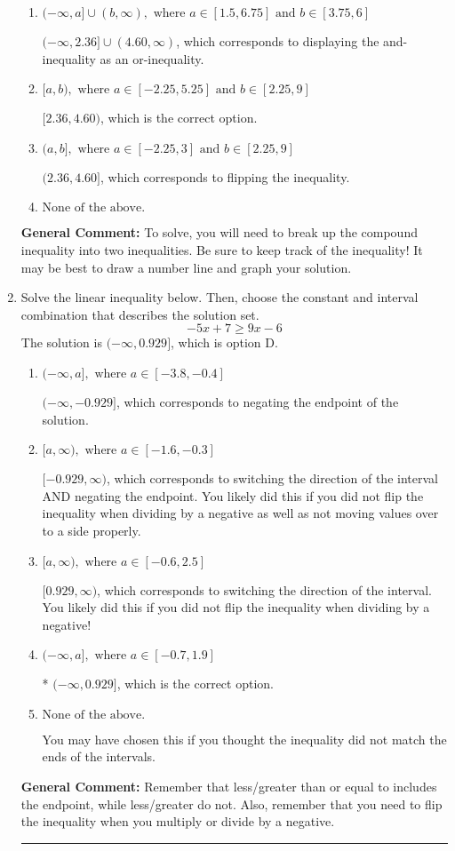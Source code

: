 \documentclass{extbook}[14pt]
\newcommand{\litem}[1]{\item #1

\rule{\textwidth}{0.4pt}}
\begin{document}
\begin{enumerate}
{\begin{enumerate}[label=\Alph*.]
$(-\infty, 2.36) \cup [4.60, \infty)$, which corresponds to displaying the and-inequality as an or-inequality AND flipping the inequality.
\item \( (-\infty, a] \cup (b, \infty), \text{ where } a \in [1.5, 6.75] \text{ and } b \in [3.75, 6] \)

$(-\infty, 2.36] \cup (4.60, \infty)$, which corresponds to displaying the and-inequality as an or-inequality.
\item \( [a, b), \text{ where } a \in [-2.25, 5.25] \text{ and } b \in [2.25, 9] \)

$[2.36, 4.60)$, which is the correct option.
\item \( (a, b], \text{ where } a \in [-2.25, 3] \text{ and } b \in [2.25, 9] \)

$(2.36, 4.60]$, which corresponds to flipping the inequality.
\item \( \text{None of the above.} \)


\end{enumerate}

\textbf{General Comment:} To solve, you will need to break up the compound inequality into two inequalities. Be sure to keep track of the inequality! It may be best to draw a number line and graph your solution.
}
\litem{
Solve the linear inequality below. Then, choose the constant and interval combination that describes the solution set.
\[ -5x + 7 \geq 9x -6 \]The solution is \( (-\infty, 0.929] \), which is option D.\begin{enumerate}[label=\Alph*.]
\item \( (-\infty, a], \text{ where } a \in [-3.8, -0.4] \)

 $(-\infty, -0.929]$, which corresponds to negating the endpoint of the solution.
\item \( [a, \infty), \text{ where } a \in [-1.6, -0.3] \)

 $[-0.929, \infty)$, which corresponds to switching the direction of the interval AND negating the endpoint. You likely did this if you did not flip the inequality when dividing by a negative as well as not moving values over to a side properly.
\item \( [a, \infty), \text{ where } a \in [-0.6, 2.5] \)

 $[0.929, \infty)$, which corresponds to switching the direction of the interval. You likely did this if you did not flip the inequality when dividing by a negative!
\item \( (-\infty, a], \text{ where } a \in [-0.7, 1.9] \)

* $(-\infty, 0.929]$, which is the correct option.
\item \( \text{None of the above}. \)

You may have chosen this if you thought the inequality did not match the ends of the intervals.
\end{enumerate}

\textbf{General Comment:} Remember that less/greater than or equal to includes the endpoint, while less/greater do not. Also, remember that you need to flip the inequality when you multiply or divide by a negative.
}
\end{enumerate}
\end{document}
